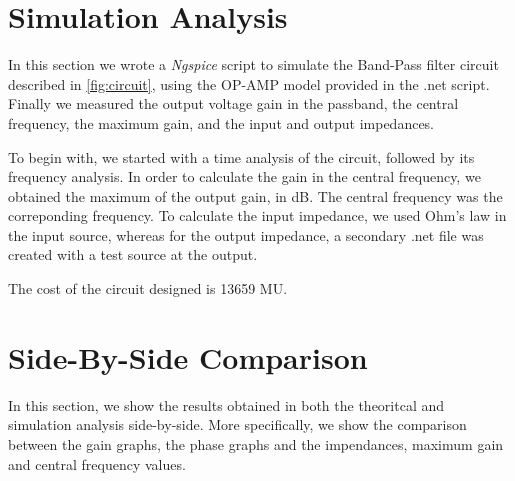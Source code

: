 \section{Simulation Analysis}
\label{sec:simulation}

In this section we wrote a \textit{Ngspice} script to simulate the Band-Pass 
filter circuit described in \ref{fig:circuit}, using the OP-AMP model provided in the .net script.
Finally we measured the output voltage gain in the passband, the central frequency, the maximum gain, and the input and output impedances.

To begin with, we started with a time analysis of the circuit, followed by its frequency analysis. In order to calculate the gain in the central frequency, we obtained the maximum of the output gain, in dB. 
The central frequency was the correponding frequency. To calculate the input impedance, we used Ohm's law in the input source, whereas for the output impedance, a secondary .net file was created with a test source at the output. 

The cost of the circuit designed is 13659 MU.


\section{Side-By-Side Comparison}
\label{sec:side}

In this section, we show the results obtained in both the theoritcal and simulation analysis side-by-side. More specifically, we show the comparison between the gain graphs, the phase graphs and the impendances, maximum gain and central frequency values.

